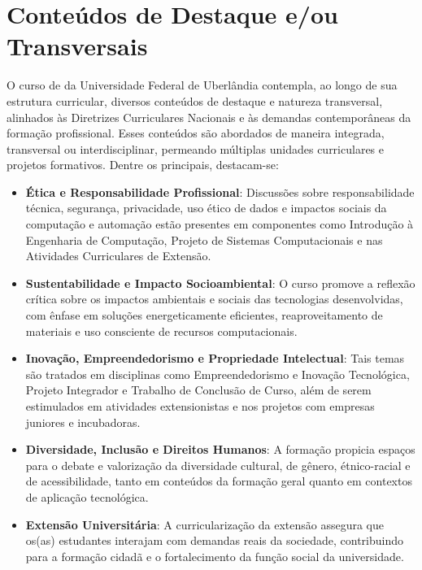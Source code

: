 \section{Conteúdos de Destaque e/ou Transversais}

O curso de \ppccurso da Universidade Federal de Uberlândia contempla, ao longo de sua estrutura curricular, diversos conteúdos de destaque e natureza transversal, alinhados às Diretrizes Curriculares Nacionais e às demandas contemporâneas da formação profissional. Esses conteúdos são abordados de maneira integrada, transversal ou interdisciplinar, permeando múltiplas unidades curriculares e projetos formativos. Dentre os principais, destacam-se:

\begin{itemize}
\item \textbf{Ética e Responsabilidade Profissional}: Discussões sobre responsabilidade técnica, segurança, privacidade, uso ético de dados e impactos sociais da computação e automação estão presentes em componentes como Introdução à Engenharia de Computação, Projeto de Sistemas Computacionais e nas Atividades Curriculares de Extensão.

\item \textbf{Sustentabilidade e Impacto Socioambiental}: O curso promove a reflexão crítica sobre os impactos ambientais e sociais das tecnologias desenvolvidas, com ênfase em soluções energeticamente eficientes, reaproveitamento de materiais e uso consciente de recursos computacionais.

\item \textbf{Inovação, Empreendedorismo e Propriedade Intelectual}: Tais temas são tratados em disciplinas como Empreendedorismo e Inovação Tecnológica, Projeto Integrador e Trabalho de Conclusão de Curso, além de serem estimulados em atividades extensionistas e nos projetos com empresas juniores e incubadoras.

\item \textbf{Diversidade, Inclusão e Direitos Humanos}: A formação propicia espaços para o debate e valorização da diversidade cultural, de gênero, étnico-racial e de acessibilidade, tanto em conteúdos da formação geral quanto em contextos de aplicação tecnológica.

\item \textbf{Extensão Universitária}: A curricularização da extensão assegura que os(as) estudantes interajam com demandas reais da sociedade, contribuindo para a formação cidadã e o fortalecimento da função social da universidade.


\end{itemize}

